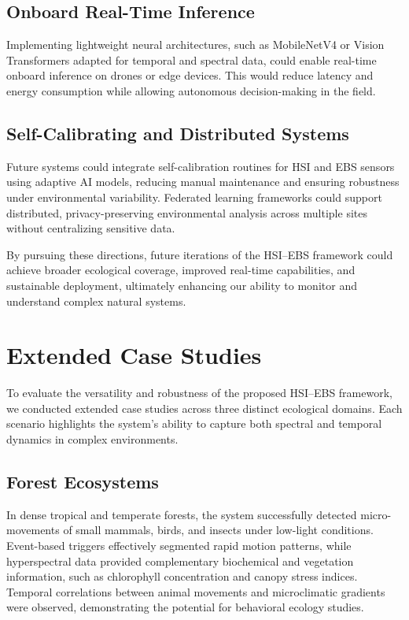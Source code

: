 \documentclass[conference]{IEEEtran}
\begin{document}
\subsection{Onboard Real-Time Inference}
Implementing lightweight neural architectures, such as MobileNetV4 or Vision Transformers adapted for temporal and spectral data, could enable real-time onboard inference on drones or edge devices. This would reduce latency and energy consumption while allowing autonomous decision-making in the field.

\subsection{Self-Calibrating and Distributed Systems}
Future systems could integrate self-calibration routines for HSI and EBS sensors using adaptive AI models, reducing manual maintenance and ensuring robustness under environmental variability. Federated learning frameworks could support distributed, privacy-preserving environmental analysis across multiple sites without centralizing sensitive data.

By pursuing these directions, future iterations of the HSI–EBS framework could achieve broader ecological coverage, improved real-time capabilities, and sustainable deployment, ultimately enhancing our ability to monitor and understand complex natural systems.


\section{Extended Case Studies}

To evaluate the versatility and robustness of the proposed HSI–EBS framework, we conducted extended case studies across three distinct ecological domains. Each scenario highlights the system’s ability to capture both spectral and temporal dynamics in complex environments.

\subsection{Forest Ecosystems}
In dense tropical and temperate forests, the system successfully detected micro-movements of small mammals, birds, and insects under low-light conditions. Event-based triggers effectively segmented rapid motion patterns, while hyperspectral data provided complementary biochemical and vegetation information, such as chlorophyll concentration and canopy stress indices. Temporal correlations between animal movements and microclimatic gradients were observed, demonstrating the potential for behavioral ecology studies.
\end{document}
